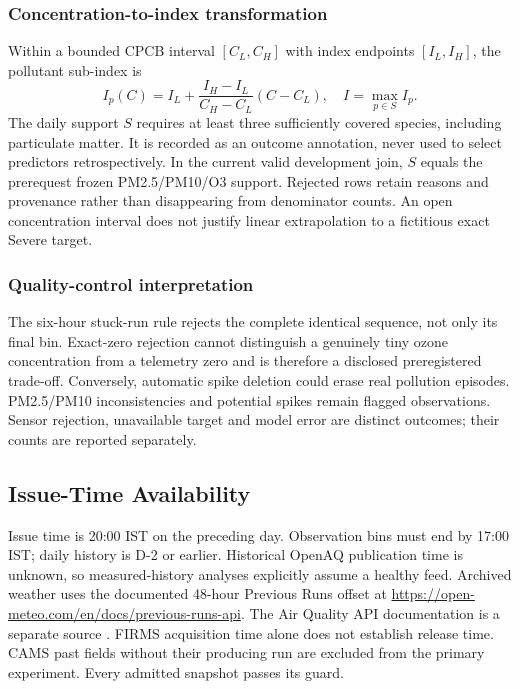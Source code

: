 \subsubsection{Concentration-to-index transformation}
Within a bounded CPCB interval $[C_L,C_H]$ with index endpoints $[I_L,I_H]$,
the pollutant sub-index is
\begin{equation}
I_p(C)=I_L+\frac{I_H-I_L}{C_H-C_L}(C-C_L),\quad I=\max_{p\in S}I_p.
\end{equation}
The daily support $S$ requires at least three sufficiently covered species,
including particulate matter. It is recorded as an outcome annotation, never
used to select predictors retrospectively. In the current valid development
join, $S$ equals the prerequest frozen PM2.5/PM10/O3 support. Rejected rows
retain reasons and provenance rather than disappearing from denominator
counts. An open concentration interval does not justify linear extrapolation
to a fictitious exact Severe target.
\subsubsection{Quality-control interpretation}
The six-hour stuck-run rule rejects the complete identical sequence, not only
its final bin. Exact-zero rejection cannot distinguish a genuinely tiny
ozone concentration from a telemetry zero and is therefore a disclosed
preregistered trade-off. Conversely, automatic spike deletion could erase
real pollution episodes. PM2.5/PM10 inconsistencies and potential spikes
remain flagged observations. Sensor rejection, unavailable target and
model error are distinct outcomes; their counts are reported separately.

\subsection{Issue-Time Availability}
Issue time is 20:00 IST on the preceding day. Observation bins must end by
17:00 IST; daily history is D-2 or earlier. Historical OpenAQ publication time
is unknown, so measured-history analyses explicitly assume a healthy feed.
Archived weather uses the documented 48-hour Previous Runs offset
at \url{https://open-meteo.com/en/docs/previous-runs-api}. The Air Quality API documentation is a separate
source \cite{openmeteo2026}. FIRMS acquisition time alone does not establish release
time. CAMS past fields without their producing run are excluded from the primary
experiment. Every admitted snapshot passes its guard.



